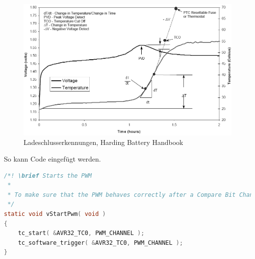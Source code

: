 \begin{figure}[ht!]
\centering
\includegraphics[angle=0,width=14cm]{LatexBeispiel/Bilder/Ladeschlussbw.png}
\caption{Ladeschlusserkennungen, Harding Battery Handbook\cite{Harding}}
\label{Ladeschluss}
\end{figure}

\newpage
So kann Code eingef\"ugt werden.
\begin{lstlisting}[frame=single,breaklines=true,basicstyle=\tiny,language=C,label={PWMStart},caption={Kommentierter Start der PWM}]
/*! \brief Starts the PWM
 * 
 * To make sure that the PWM behaves correctly after a Compare Bit Change the PWM is started and reset with a software trigger.
 */
static void vStartPwm( void )
{
	tc_start( &AVR32_TC0, PWM_CHANNEL );
	tc_software_trigger( &AVR32_TC0, PWM_CHANNEL );
}
\end{lstlisting}


